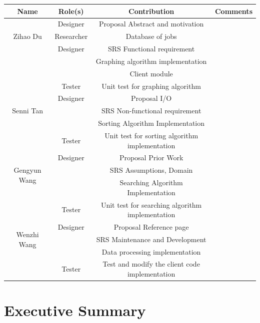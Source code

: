 \documentclass[12pt]{article}
\begin{document}
\begin{center}
\begin{tabular}{ |c|c|c|c| } 
\hline
Name & Role(s) & Contribution & Comments \\
\hline
\multirow{3}{4em}{Zihao Du} & Designer & Proposal Abstract and motivation & \\ 
& Researcher & Database of jobs & \\ 
& Designer & SRS Functional requirement  & \\ 
& ~ & Graphing algorithm implementation & \\
& ~ & Client module & \\
& Tester & Unit test for graphing algorithm & \\
\hline
\multirow{3}{4em}{Senni Tan} & Designer & Proposal I/O& \\ 
& ~ & SRS Non-functional requirement  & \\ 
& ~ & Sorting Algorithm Implementation & \\
& Tester & Unit test for sorting algorithm implementation & \\
\hline
\multirow{3}{4em}{Gengyun Wang} & Designer & Proposal Prior Work& \\ 
& ~ & SRS Assumptions, Domain  & \\ 
& ~ & Searching Algorithm Implementation & \\
& Tester & Unit test for searching algorithm implementation & \\
\hline
\multirow{3}{4em}{Wenzhi Wang} & Designer & Proposal Reference page& \\ 
& ~ & SRS  Maintenance and Development & \\ 
& ~ & Data processing implementation & \\
& Tester & Test and modify the client code implementation & \\
\hline
\end{tabular}
\end{center}

\newpage

\section*{Executive Summary}


\tableofcontents
\newpage
\end{document}

